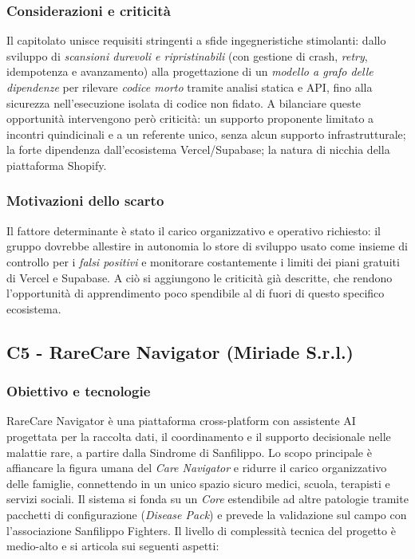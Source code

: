 \documentclass[11pt, a4paper]{article}
\begin{document}
\subsubsection{Considerazioni e criticità}
Il capitolato unisce requisiti stringenti a sfide ingegneristiche stimolanti: dallo sviluppo di \textit{scansioni durevoli e ripristinabili} (con gestione di crash, \textit{retry}, idempotenza e avanzamento) alla progettazione di un \textit{modello a grafo delle dipendenze} per rilevare \textit{codice morto} tramite analisi statica e API, fino alla sicurezza nell'esecuzione isolata di codice non fidato. A bilanciare queste opportunità intervengono però criticità: un supporto proponente limitato a incontri quindicinali e a un referente unico, senza alcun supporto infrastrutturale; la forte dipendenza dall'ecosistema Vercel/Supabase; la natura di nicchia della piattaforma Shopify.

\subsubsection{Motivazioni dello scarto}
Il fattore determinante è stato il carico organizzativo e operativo richiesto: il gruppo dovrebbe allestire in autonomia lo store di sviluppo usato come insieme di controllo per i \textit{falsi positivi} e monitorare costantemente i limiti dei piani gratuiti di Vercel e Supabase. A ciò si aggiungono le criticità già descritte, che rendono l'opportunità di apprendimento poco spendibile al di fuori di questo specifico ecosistema.

\subsection{C5 - RareCare Navigator (Miriade S.r.l.)}
\subsubsection{Obiettivo e tecnologie}
RareCare Navigator è una piattaforma cross-platform con assistente AI progettata per la raccolta dati, il coordinamento e il supporto decisionale nelle malattie rare, a partire dalla Sindrome di Sanfilippo. Lo scopo principale è affiancare la figura umana del \textit{Care Navigator} e ridurre il carico organizzativo delle famiglie, connettendo in un unico spazio sicuro medici, scuola, terapisti e servizi sociali. \newline
Il sistema si fonda su un \textit{Core} estendibile ad altre patologie tramite pacchetti di configurazione (\textit{Disease Pack}) e prevede la validazione sul campo con l'associazione Sanfilippo Fighters. \newline
Il livello di complessità tecnica del progetto è medio-alto e si articola sui seguenti aspetti:
\end{document}
